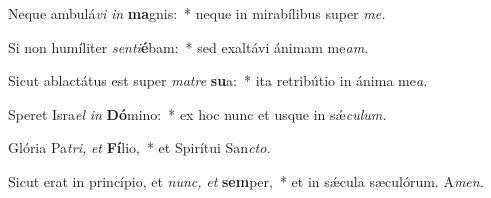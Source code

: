 \item Neque ambulá\textit{vi} \textit{in} \textbf{ma}gnis:~* neque in mirabílibus super \textit{me.}
\item Si non humíliter \textit{senti}\textbf{é}bam:~* sed exaltávi ánimam me\tinyhspace\textit{am.}
\item Sicut ablactátus est super \textit{matre} \textbf{su}a:~* ita retribútio in ánima me\tinyhspace\textit{a.}
\item Speret Isra\tinyhspace\textit{el} \textit{in} \textbf{Dó}mino:~* ex hoc nunc et usque in sǽ\tinyhspace\textit{culum.}
\item Glória Pa\tinyhspace\textit{tri,} \textit{et} \textbf{Fí}lio,~* et Spirítui San\tinyhspace\textit{cto.}
\item Sicut erat in princípio, et \textit{nunc,} \textit{et} \textbf{sem}per,~* et in sǽcula sæculórum. A\textit{men.}
